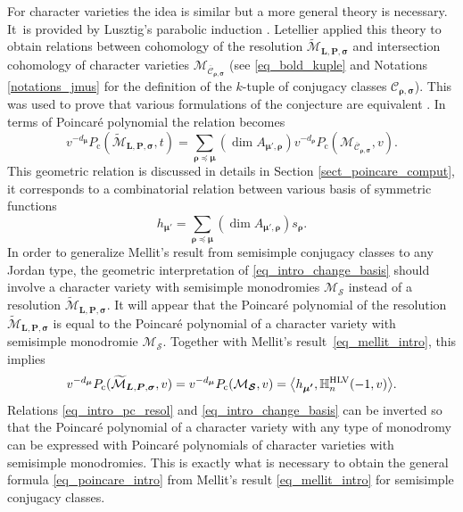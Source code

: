 \documentclass[JEP,XML,SOM,NoEqCountersInSection,Unicode,published]{cedram}
\newcommand{\rc}{\mathrm{c}}
\newcommand{\HLV}{\textup{HLV}}
\newcommand{\blangle}{\bigl\langle}
\newcommand{\brangle}{\bigr\rangle}
\theoremstyle{definition}
\theoremstyle{plain}
\newcommand{\mlps}{\widetilde{\mathcal{M}}_{\boldsymbol{L},\boldsymbol{P},\boldsymbol{\sigma}}}
\begin{document}
For character varieties the idea is similar but a more general theory is necessary. It~is provided by Lusztig's parabolic induction \cite{Lusztig1984,lusztig_character_sheaves,Lusztig1986}. Letellier applied this theory to obtain relations between cohomology of the resolution $\mlps$ and intersection cohomology of character varieties $\mathcal{M}_{\overline{\mathcal{C}}_{\boldsymbol{\rho},\boldsymbol{\sigma}}}$ (see \eqref{eq_bold_kuple} and Notations \ref{notations_jmus} for the definition of the $k$-tuple of conjugacy classes $\mathcal{C}_{\boldsymbol{\rho},\boldsymbol{\sigma}}$). This was used to prove that various formulations of the conjecture are equivalent \cite[Prop.\,5.7]{Letellier_gl}.
In terms of Poincaré polynomial the relation becomes
\begin{equation}\label{eq_intro_pc_resol}
v^{-d_{\boldsymbol{\mu}}} P_{\rc}(\mlps,t) = \sum_{\boldsymbol{\rho\preceq\mu}}(\dim A_{\boldsymbol{\mu',\rho}}) v^{-d_{\boldsymbol{\rho}}} P_{\rc}(\mathcal{M}_{\overline{\mathcal{C}}_{\boldsymbol{\rho},\boldsymbol{\sigma}}}, v).
\end{equation}
This geometric relation is discussed in details in Section \ref{sect_poincare_comput}, it corresponds to a combinatorial relation between various basis of symmetric functions
\begin{equation}\label{eq_intro_change_basis}
h_{\boldsymbol{\mu'}} = \sum_{\boldsymbol{\rho\preceq\mu}} \left(\dim A_{\boldsymbol{\mu',\rho}}\right) s_{\boldsymbol{\rho}}.
\end{equation}
In order to generalize Mellit's result from semisimple conjugacy classes to any Jordan type, the geometric interpretation of \eqref{eq_intro_change_basis} should involve a character variety with semisimple monodromies $\mathcal{M}_{\boldsymbol{\mathcal{S}}}$ instead of a resolution $\mlps$. It will appear that the Poincaré polynomial of the resolution $\mlps$ is equal to the Poincaré polynomial of a character variety with semisimple monodromie $\mathcal{M}_{\boldsymbol{\mathcal{S}}}$. Together with Mellit's result~\eqref{eq_mellit_intro}, this implies
\[
v^{-d_{\boldsymbol{\mu}}} P_{\rc}(\mlps,v) = v^{-d_{\boldsymbol{\mu}}} P_{\rc}(\mathcal{M}_{\boldsymbol{\mathcal{S}}},v) =\blangle h_{\boldsymbol{\mu'}}, \mathbb{H}_n^{\HLV}(-1,v)\brangle.
\]
Relations \eqref{eq_intro_pc_resol} and \eqref{eq_intro_change_basis} can be inverted so that the Poincaré polynomial of a character variety with any type of monodromy can be expressed with Poincaré polynomials of character varieties with semisimple monodromies. This is exactly what is necessary to obtain the general formula \eqref{eq_poincare_intro} from Mellit's result \eqref{eq_mellit_intro} for semisimple conjugacy classes.
\end{document}
